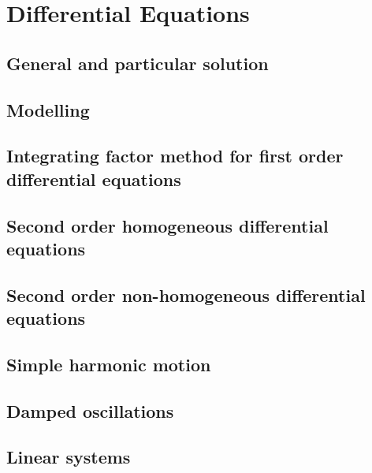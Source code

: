 \chapter{Differential Equations}

\section{General and particular solution}
\section{Modelling}
\section{Integrating factor method for first order differential equations}
\section{Second order homogeneous differential equations}
\section{Second order non-homogeneous differential equations}
\section{Simple harmonic motion}
\section{Damped oscillations}
\section{Linear systems}
